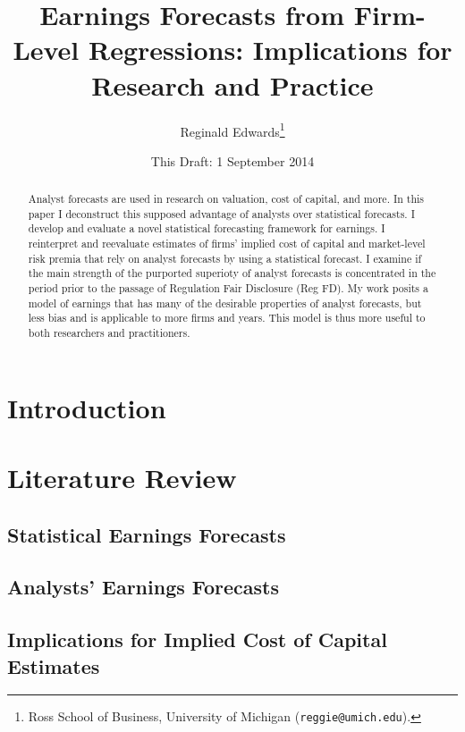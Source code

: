 \documentclass[12pt, letterpaper]{article}
\begin{document}
\title{Earnings Forecasts from Firm-Level Regressions: Implications for Research and Practice}
\author{Reginald Edwards\footnote{Ross School of Business, University of 
Michigan (\texttt{reggie@umich.edu}).}}
\date{This Draft: 1 September 2014}
\maketitle

\begin{abstract} 

Analyst 
forecasts are used in research  on valuation, cost of capital, and more. In this paper I deconstruct
this supposed advantage of analysts over statistical forecasts. I develop and evaluate a novel
statistical forecasting framework for earnings. I reinterpret and reevaluate estimates of firms' 
implied cost of capital and market-level risk premia that rely on analyst forecasts by using a 
statistical forecast. I examine if the main strength of the purported superioty of analyst forecasts
is concentrated in the period prior to the passage of Regulation Fair Disclosure (Reg FD). 
My work posits a model of earnings that has many of the 
desirable properties of analyst forecasts, but less bias and is applicable to more firms and years.
This model is thus more useful to both researchers and practitioners.

\end{abstract}

\section{Introduction}


\section{Literature Review}

\subsection{Statistical Earnings Forecasts}


\subsection{Analysts' Earnings Forecasts}


\subsection{Implications for Implied Cost of Capital Estimates}
\end{document}
